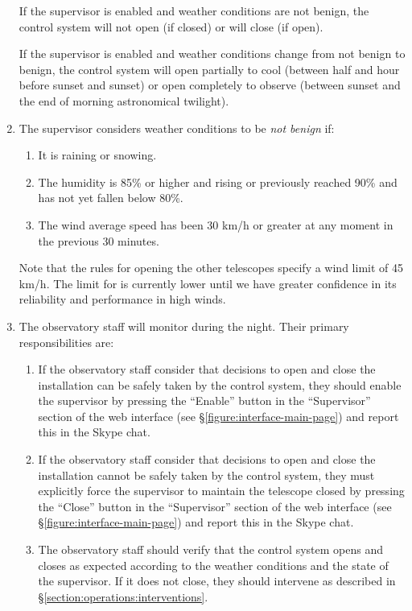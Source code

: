 \begin{enumerate}
If the supervisor is enabled and weather conditions are not benign, the control system will not open (if closed) or will close (if open).

If the supervisor is enabled and weather conditions change from not benign to benign, the control system will open partially to cool (between half and hour before sunset and sunset) or open completely to observe (between sunset and the end of morning astronomical twilight).

\item
The supervisor considers weather conditions to be \emph{not benign} if:
\begin{enumerate}
\item It is raining or snowing.
\item The humidity is 85\% or higher and rising or previously reached 90\% and has not yet fallen below 80\%.
\item The wind average speed has been 30 km/h or greater at any moment in the previous 30 minutes.  
\end{enumerate}
Note that the rules for opening the other telescopes specify a wind limit of 45 km/h. The limit for {\projectname} is currently lower until we have greater confidence in its reliability and performance in high winds.

\item
The observatory staff will monitor {\projectname} during the night. Their primary responsibilities are:
\begin{enumerate}
\item If the observatory staff consider that decisions to open and close the installation can be safely taken by the control system, they should enable the supervisor by pressing the “Enable” button in the “Supervisor” section of the web interface (see \S\ref{figure:interface-main-page}) and report this in the Skype chat.
\item If the observatory staff consider that decisions to open and close the installation cannot be safely taken by the control system, they must explicitly force the supervisor to maintain the telescope closed by pressing the “Close” button in the “Supervisor” section of the web interface (see \S\ref{figure:interface-main-page}) and report this in the Skype chat. 
\item
The observatory staff should verify that the control system opens and closes as expected according to the weather conditions and the state of the supervisor. If it does not close, they should intervene as described in \S\ref{section:operations:interventions}.


\end{enumerate}
\end{enumerate}
